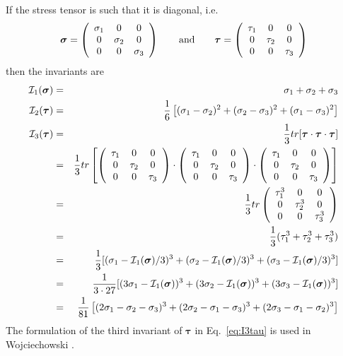 If the stress tensor is such that it is diagonal, i.e.
\[
{\bm \sigma}= \left( \begin{array}{ccc}
\sigma_1 & 0 & 0 \\
0 & \sigma_2 & 0 \\
0 & 0 & \sigma_3
\end{array}\right)
\qquad
{\rm and}
\qquad
{\bm \tau}= \left( \begin{array}{ccc}
\tau_1 & 0 & 0 \\
0 & \tau_2 & 0 \\
0 & 0 & \tau_3
\end{array}\right)
\]
then the invariants are 
\begin{eqnarray}
{\cal I}_1({\bm \sigma}) &=& \sigma_1 + \sigma_2+ \sigma_3 \nonumber\\
{\cal I}_2({\bm \tau}) &=& \frac{1}{6}\left[(\sigma_{1}-\sigma_{2})^2 + (\sigma_{2}-\sigma_{3})^2 
+ (\sigma_{1}-\sigma_{3})^2 \right] \\ 
{\cal I}_3({\bm \tau}) 
&=& \frac{1}{3} tr[{\bm \tau}\cdot{\bm \tau}\cdot {\bm \tau}]  \nonumber\\
&=& \frac{1}{3} tr
\left[
\left(
\begin{array}{ccc}
\tau_1 & 0 & 0 \\
0 & \tau_2 & 0 \\
0 & 0 & \tau_3 
\end{array}
\right)
\cdot
\left(
\begin{array}{ccc}
\tau_1 & 0 & 0 \\
0 & \tau_2 & 0 \\
0 & 0 & \tau_3 
\end{array}
\right)
\cdot
\left(
\begin{array}{ccc}
\tau_1 & 0 & 0 \\
0 & \tau_2 & 0 \\
0 & 0 & \tau_3 
\end{array}
\right)
\right] \nonumber\\
&=&  \frac{1}{3} tr
\left(
\begin{array}{ccc}
\tau_1^3 & 0 & 0 \\
0 & \tau_2^3 & 0 \\
0 & 0 & \tau_3^3 
\end{array}
\right) \nonumber\\
&=& \frac{1}{3}(\tau_1^3+\tau_2^3+\tau_3^3) \nonumber\\
&=&  \frac{1}{3} [ 
(\sigma_1-{\cal I}_1({\bm \sigma})/3)^3+  
(\sigma_2-{\cal I}_1({\bm \sigma})/3)^3+
(\sigma_3-{\cal I}_1({\bm \sigma})/3)^3 ]   \nonumber\\ 
&=&  \frac{1}{3\cdot 27} [ 
(3\sigma_1-{\cal I}_1({\bm \sigma}))^3+  
(3\sigma_2-{\cal I}_1({\bm \sigma}))^3+
(3\sigma_3-{\cal I}_1({\bm \sigma}))^3 ]   \nonumber\\ 
&=& \frac{1}{81}
\left[
(2\sigma_1-\sigma_2-\sigma_3)^3+
(2\sigma_2-\sigma_1-\sigma_3)^3+
(2\sigma_3-\sigma_1-\sigma_2)^3
\right] 
\label{eq:3rdinvb} \label{eq:I3tau}
\end{eqnarray}
The formulation of the third invariant of ${\bm \tau}$  in Eq.~\ref{eq:I3tau} 
is used in Wojciechowski \cite{wojc18}.

